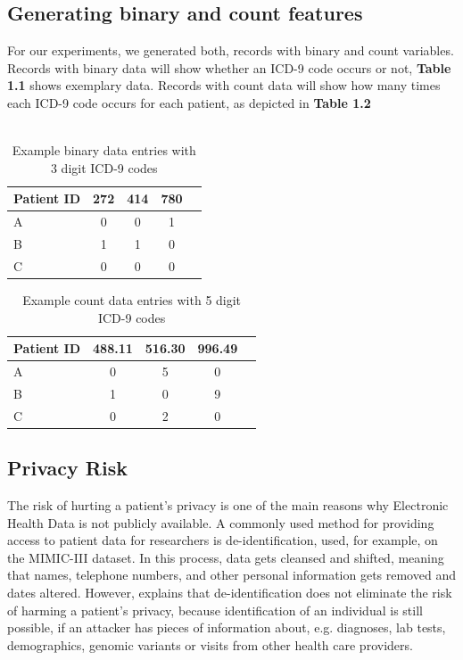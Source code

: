 \documentclass[11pt, a4paper, oneside]{book}
\begin{document}
\subsection{Generating binary and count features}
For our experiments, we generated both, records with binary and count variables. Records with binary data will show whether an ICD-9 code occurs or not, \textbf{Table 1.1} shows exemplary data. Records with count data will show how many times each ICD-9 code occurs for each patient, as depicted in \textbf{Table 1.2}
\\
\\

\begin{table}
\begin{center}
\begin{tabular}{l*{3}{c}r }
Patient ID & 272 & 414 & 780 \\
\hline
A & 0 & 0 & 1 \\
B & 1 & 1 & 0 \\
C & 0 & 0 & 0 \\
\hline
\end{tabular}
\caption{Example binary data entries with 3 digit ICD-9 codes}
\label{tab:example-binary}
\end{center}
\end{table}


\begin{table}
\begin{center}
\begin{tabular}{l*{3}{c}r }
Patient ID & 488.11 & 516.30 & 996.49 \\
\hline
A & 0 & 5 & 0 \\
B & 1 & 0 & 9 \\
C & 0 & 2 & 0 \\
\hline
\end{tabular}
\caption{Example count data entries with 5 digit ICD-9 codes}
\label{tab:example-count}
\end{center}
\end{table}

\subsection{Privacy Risk}
The risk of hurting a patient's privacy is one of the main reasons why Electronic Health Data is not publicly available. A commonly used method for providing access to patient data for researchers is de-identification, used, for example, on the MIMIC-III dataset. In this process, data gets cleansed and shifted, meaning that names, telephone numbers, and other personal information gets removed and dates altered. \citep{johnson2016mimic}
However, \citep{Choi2017} explains that de-identification does not eliminate the risk of harming a patient's privacy, because identification of an individual is still possible, if an attacker has pieces of information about, e.g. diagnoses, lab tests, demographics, genomic variants or visits from other health care providers.
\end{document}
